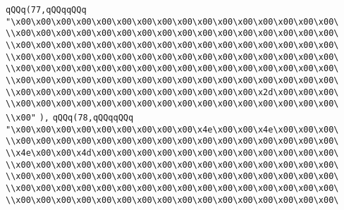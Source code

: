 \verb|qQQq(77,qQQqqQQq|\newline
\verb|"\x00\x00\x00\x00\x00\x00\x00\x00\x00\x00\x00\x00\x00\x00\x00\x00\|\newline
\verb|\\x00\x00\x00\x00\x00\x00\x00\x00\x00\x00\x00\x00\x00\x00\x00\x00\|\newline
\verb|\\x00\x00\x00\x00\x00\x00\x00\x00\x00\x00\x00\x00\x00\x00\x00\x00\|\newline
\verb|\\x00\x00\x00\x00\x00\x00\x00\x00\x00\x00\x00\x00\x00\x00\x00\x00\|\newline
\verb|\\x00\x00\x00\x00\x00\x00\x00\x00\x00\x00\x00\x00\x00\x00\x00\x00\|\newline
\verb|\\x00\x00\x00\x00\x00\x00\x00\x00\x00\x00\x00\x00\x00\x00\x00\x00\|\newline
\verb|\\x00\x00\x00\x00\x00\x00\x00\x00\x00\x00\x00\x00\x2d\x00\x00\x00\|\newline
\verb|\\x00\x00\x00\x00\x00\x00\x00\x00\x00\x00\x00\x00\x00\x00\x00\x00\|\newline
\verb|\\x00"|\newline
\verb|),|\newline
\verb|qQQq(78,qQQqqQQq|\newline
\verb|"\x00\x00\x00\x00\x00\x00\x00\x00\x00\x4e\x00\x00\x4e\x00\x00\x00\|\newline
\verb|\\x00\x00\x00\x00\x00\x00\x00\x00\x00\x00\x00\x00\x00\x00\x00\x00\|\newline
\verb|\\x4e\x00\x00\x4d\x00\x00\x00\x00\x00\x00\x00\x00\x00\x00\x00\x00\|\newline
\verb|\\x00\x00\x00\x00\x00\x00\x00\x00\x00\x00\x00\x00\x00\x00\x00\x00\|\newline
\verb|\\x00\x00\x00\x00\x00\x00\x00\x00\x00\x00\x00\x00\x00\x00\x00\x00\|\newline
\verb|\\x00\x00\x00\x00\x00\x00\x00\x00\x00\x00\x00\x00\x00\x00\x00\x00\|\newline
\verb|\\x00\x00\x00\x00\x00\x00\x00\x00\x00\x00\x00\x00\x00\x00\x00\x00\|\newline
